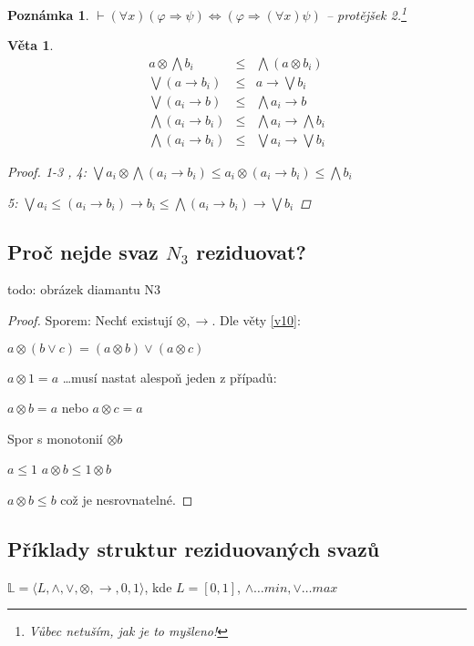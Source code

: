 \documentclass[10pt, a4paper, titlepage]{article}
\theoremstyle{note}
\newtheorem{veta}{Věta}
\newtheorem{poznamka}{Poznámka}
\newcommand{\rlat}{\langle L, \wedge, \vee,\otimes,\rightarrow,0,1\rangle}
\begin{document}
\begin{poznamka}
$\vdash (\forall x)(\varphi\Rightarrow\psi)\Leftrightarrow(\varphi\Rightarrow(\forall x)\psi)$ -- protějšek 2.\footnote{Vůbec netuším, jak je to myšleno!}
\end{poznamka}
\begin{veta}
\begin{eqnarray}
a\otimes \bigwedge b_{i}&\leq&\bigwedge(a\otimes b_{i})\nonumber\\
\bigvee(a\rightarrow b_{i})&\leq& a\rightarrow \bigvee b_{i}\nonumber\\
\bigvee(a_{i}\rightarrow b)&\leq& \bigwedge a_{i}\rightarrow b\nonumber\\
\bigwedge(a_{i}\rightarrow b_{i})&\leq&\bigwedge a_{i}\rightarrow\bigwedge b_{i}\nonumber\\
\bigwedge(a_{i}\rightarrow b_{i})&\leq&\bigvee a_{i}\rightarrow \bigvee b_{i}\nonumber
\end{eqnarray}
\begin{proof}
1-3 , 4: $\bigvee a_{i} \otimes \bigwedge(a_{i}\rightarrow b_{i})\leq a_{i}\otimes(a_{i}\rightarrow b_{i})\leq \bigwedge b_{i}$

5: $\bigvee a_{i}\leq(a_{i}\rightarrow b_{i})\rightarrow b_{i}\leq \bigwedge(a_{i}\rightarrow b_{i})\rightarrow\bigvee b_{i}$
\end{proof}
\end{veta}
\subsection{Proč nejde svaz $N_{3}$ reziduovat?}
todo: obrázek diamantu N3
\begin{proof}
Sporem: Nechť existují $\otimes, \rightarrow$. Dle věty \ref{v10}:

$a \otimes (b\vee c) = (a\otimes b) \vee (a\otimes c)$

$a\otimes 1 = a$ \dots musí nastat alespoň jeden z případů:

$a\otimes b = a$ nebo $a\otimes c = a$

Spor s monotonií $\otimes b$

$a\leq 1$\hspace{2em} $a\otimes b\leq 1\otimes b$

$a \otimes b\leq b$ což je nesrovnatelné.
\end{proof}
\subsection{Příklady struktur reziduovaných svazů}
$\mathbb{L} = \rlat$, kde $L = [0, 1]$, $\wedge\dots min, \vee\dots max$
\end{document}
